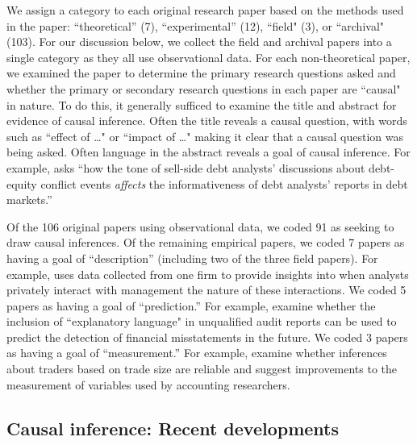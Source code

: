 \documentclass[11pt]{amsart}
\begin{document}
We assign a category to each original research paper based on the methods used in the paper: ``theoretical''  (7), ``experimental'' (12), ``field" (3), or ``archival"  (103). 
For our discussion below, we collect the field and archival papers into a single category as they all use observational data.
For each non-theoretical paper, we examined the paper to determine the primary research questions asked and whether the primary or secondary research questions in each paper are
``causal" in nature.
To do this, it generally sufficed to examine the title and abstract for evidence of causal inference. 
Often the title reveals a causal question, with words such as  ``effect of \dots" or ``impact of \dots"  
\citep[e.g.][]{Cohen:2014jl,Clorproell:2014cv} making it clear that a causal question was being asked. 
Often language in the abstract reveals a goal of causal inference. 
For example, \citet{deFranco:2014ct} asks ``how the tone of sell-side debt analysts' discussions about debt-equity conflict events \emph{affects} the informativeness of debt analysts’ reports in debt markets.''

Of the 106 original papers using observational data, we coded 91 as seeking to draw causal inferences.
Of the remaining empirical papers, we coded 7 papers as having a goal of ``description'' (including two of the three field papers). 
For example, \citet{Soltes:2013ba} uses data collected from one firm to provide insights into when analysts privately interact with management the nature of these interactions.
We coded 5 papers as having a goal of ``prediction.'' 
For example, \citet{Czerney:2014bv} examine whether the inclusion of ``explanatory language" in unqualified audit reports can be used to predict the detection of financial misstatements in the future.
We coded 3 papers as having a goal of ``measurement.'' 
For example, \citet{Cready:2014ji} examine whether inferences about traders based on trade size are reliable and suggest improvements to the measurement of variables used by accounting researchers. 

\subsection{Causal inference: Recent developments}

\end{document}
